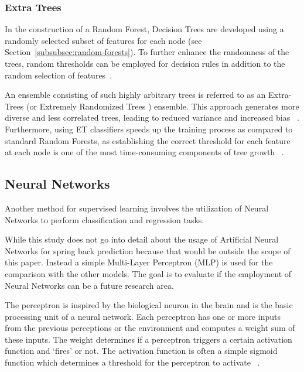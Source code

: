 \subsubsection{Extra Trees}\label{subsubsec:extra-trees}
In the construction of a Random Forest, Decision Trees are developed using a randomly selected subset of features for
each node (see Section~\ref{subsubsec:random-forests}). To further enhance the randomness of the trees, random
thresholds can be employed for decision rules in addition to the random selection of
features~\cite[p. 351]{geron2022hands}.

An ensemble consisting of such highly arbitrary trees is referred to as an Extra-Trees (or Extremely Randomized Trees
) ensemble.
This approach generates more diverse and less correlated trees, leading to reduced variance and increased
bias
~\cite[p. 351]{geron2022hands}.
Furthermore, using ET classifiers speeds up the training process as compared to standard Random Forests, as
establishing the correct threshold for each feature at each node is one of the most time-consuming components of tree
growth
~\cite[p. 351]{geron2022hands}.

\subsection{Neural Networks}\label{subsec:neural-networks}
Another method for supervised learning involves the utilization of Neural Networks to
perform classification and regression tasks.

While this study does not go into detail about the usage of Artificial Neural Networks for spring back prediction
because that would be outside the scope of this paper.
Instead a simple Multi-Layer Perceptron (MLP) is used for the comparison with the other models.
The goal is to evaluate if the employment of Neural Networks can be a future research area.

The perceptron is inspired by the biological neuron in the brain and is the basic processing unit of a neural
network.
Each perceptron has one or more inputs from the previous perceptions or the environment and computes a weight sum of
these inputs.
The weight determines if a perceptron triggers a certain activation function and `fires' or
not.
The activation function is often a simple sigmoid function which determines a threshold for the perceptron to activate
~\cite[pp. 271--273]{alpaydin2020introduction}.

